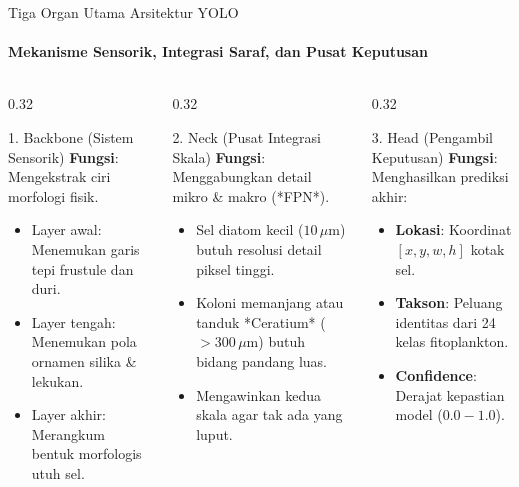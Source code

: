 \documentclass[aspectratio=169, 10pt]{beamer}
\begin{document}
\begin{frame}{Tiga Organ Utama Arsitektur YOLO}
    \framesubtitle{Mekanisme Sensorik, Integrasi Saraf, dan Pusat Keputusan}
    
    \begin{columns}[T]
        \begin{column}{0.32\textwidth}
            \begin{conceptcard}{1. Backbone (Sistem Sensorik)}
                \scriptsize
                \textbf{Fungsi}: Mengekstrak ciri morfologi fisik.
                \begin{itemize}\setlength\itemsep{2pt}
                    \item Layer awal: Menemukan garis tepi frustule dan duri.
                    \item Layer tengah: Menemukan pola ornamen silika & lekukan.
                    \item Layer akhir: Merangkum bentuk morfologis utuh sel.
                \end{itemize}
            \end{conceptcard}
        \end{column}
        
        \begin{column}{0.32\textwidth}
            \begin{biocard}{2. Neck (Pusat Integrasi Skala)}
                \scriptsize
                \textbf{Fungsi}: Menggabungkan detail mikro & makro (*FPN*).
                \begin{itemize}\setlength\itemsep{2pt}
                    \item Sel diatom kecil ($10\,\mu\text{m}$) butuh resolusi detail piksel tinggi.
                    \item Koloni memanjang atau tanduk *Ceratium* ($>300\,\mu\text{m}$) butuh bidang pandang luas.
                    \item Mengawinkan kedua skala agar tak ada yang luput.
                \end{itemize}
            \end{biocard}
        \end{column}
        
        \begin{column}{0.32\textwidth}
            \begin{alertcard}{3. Head (Pengambil Keputusan)}
                \scriptsize
                \textbf{Fungsi}: Menghasilkan prediksi akhir:
                \begin{itemize}\setlength\itemsep{2pt}
                    \item \textbf{Lokasi}: Koordinat $[x, y, w, h]$ kotak sel.
                    \item \textbf{Takson}: Peluang identitas dari 24 kelas fitoplankton.
                    \item \textbf{Confidence}: Derajat kepastian model ($0.0 - 1.0$).
                \end{itemize}
            \end{alertcard}
        \end{column}
    \end{columns}
    

\end{frame}
\end{document}
